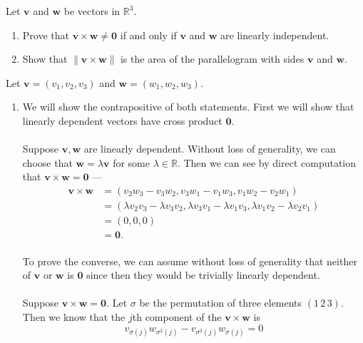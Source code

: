 \documentclass[12 pt, letterpaper]{hmcpset}
\begin{document}
\pagebreak

\begin{problem}[Problem 3.]
	Let $\mathbf{v}$ and $\mathbf{w}$ be vectors in $\mathbb{R}^3$.
	\begin{enumerate}
		\item Prove that $\mathbf{v} \times \mathbf{w} \neq \mathbf{0}$ if and only if $\mathbf{v}$ and $\mathbf{w}$ are linearly independent.
		\item Show that $\lVert \mathbf{v} \times \mathbf{w} \rVert$ is the area of the parallelogram with sides $\mathbf{v}$ and $\mathbf{w}$.
	\end{enumerate}
\end{problem}

\begin{solution}
	Let $\mathbf{v} = (v_1, v_2, v_3)$ and $\mathbf{w} = (w_1, w_2, w_3)$.
	\begin{enumerate}
		\item
			We will show the contrapositive of both statements. First we will show that linearly dependent vectors have cross product $\mathbf{0}$. \\\\
			Suppose $\mathbf{v}, \mathbf{w}$ are linearly dependent. Without loss of generality, we can choose that $\mathbf{w} = \lambda \mathbf{v}$ for some $\lambda \in \mathbb{R}$. Then we can see by direct computation that $\mathbf{v} \times \mathbf{w} = \mathbf{0}$ ---
			\[
				\begin{split}
					\mathbf{v} \times \mathbf{w} & = (v_2 w_3 - v_3 w_2, v_3 w_1 - v_1 w_3, v_1 w_2 - v_2 w_1) \\
								     & = (\lambda v_2 v_3 - \lambda v_3 v_2, \lambda v_3 v_1 - \lambda v_1 v_3, \lambda v_1 v_2 - \lambda v_2 v_1) \\
								     & = (0, 0, 0) \\
								     & = \mathbf{0}.
				\end{split}
			\] \\
			To prove the converse, we can assume without loss of generality that neither of $\mathbf{v}$ or $\mathbf{w}$ is $\mathbf{0}$ since then they would be trivially linearly dependent. \\\\
			Suppose $\mathbf{v} \times \mathbf{w} = \mathbf{0}$. Let $\sigma$ be the permutation of three elements $(1 \, 2 \, 3)$. Then we know that the $j$th component of the $\mathbf{v} \times \mathbf{w}$ is
			\[
				v_{\sigma(j)} w_{\sigma^2(j)} - v_{\sigma^2(j)} w_{\sigma(j)} = 0
			\]

\end{enumerate}
\end{solution}
\end{document}
